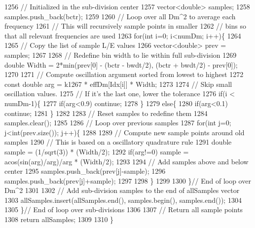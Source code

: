 \begin{DoxyCode}
1256     \textcolor{comment}{// Initialized in the sub-division center}
1257     vector<double> samples;
1258     samples.push\_back(bctr);
1259 
1260     \textcolor{comment}{// Loop over all Dm^2 to average each frequency}
1261     \textcolor{comment}{// This will recursively sample points in smaller}
1262     \textcolor{comment}{// bins so that all relevant frequencies are used}
1263     \textcolor{keywordflow}{for}(\textcolor{keywordtype}{int} i=0; i<numDm; i++)\{
1264 
1265       \textcolor{comment}{// Copy the list of sample L/E values}
1266       vector<double> prev = samples;
1267 
1268       \textcolor{comment}{// Redefine bin width to lie within full sub-division}
1269       \textcolor{keywordtype}{double} Width = 2*min(prev[0] - (bctr - bwdt/2), (bctr + bwdt/2) - prev[0]);
1270 
1271       \textcolor{comment}{// Compute oscillation argument sorted from lowest  to highest}
1272       \textcolor{keyword}{const} \textcolor{keywordtype}{double} arg = k1267 * effDm[Idx[i]] * Width;
1273 
1274       \textcolor{comment}{// Skip small oscillation values.}
1275       \textcolor{comment}{// If it's the last one, lower the tolerance}
1276       \textcolor{keywordflow}{if}(i < numDm-1)\{
1277         \textcolor{keywordflow}{if}(arg<0.9) \textcolor{keywordflow}{continue};
1278       \}
1279       \textcolor{keywordflow}{else}\{
1280         \textcolor{keywordflow}{if}(arg<0.1) \textcolor{keywordflow}{continue};
1281       \}
1282 
1283       \textcolor{comment}{// Reset samples to redefine them}
1284       samples.clear();
1285 
1286       \textcolor{comment}{// Loop over previous samples}
1287       \textcolor{keywordflow}{for}(\textcolor{keywordtype}{int} j=0; j<int(prev.size()); j++)\{
1288 
1289         \textcolor{comment}{// Compute new sample points around old samples}
1290         \textcolor{comment}{// This is based on a oscillatory quadrature rule}
1291         \textcolor{keywordtype}{double} sample = (1/sqrt(3)) * (Width/2);
1292         \textcolor{keywordflow}{if}(arg!=0) sample = acos(sin(arg)/arg)/arg * (Width/2);
1293 
1294         \textcolor{comment}{// Add samples above and below center}
1295         samples.push\_back(prev[j]-sample);
1296         samples.push\_back(prev[j]+sample);
1297 
1298       \}
1299 
1300     \}\textcolor{comment}{// End of loop over Dm^2}
1301 
1302     \textcolor{comment}{// Add sub-division samples to the end of allSamples vector}
1303     allSamples.insert(allSamples.end(), samples.begin(), samples.end());
1304 
1305   \}\textcolor{comment}{// End of loop over sub-divisions}
1306 
1307   \textcolor{comment}{// Return all sample points}
1308   \textcolor{keywordflow}{return} allSamples;
1309 
1310 \}
\end{DoxyCode}

